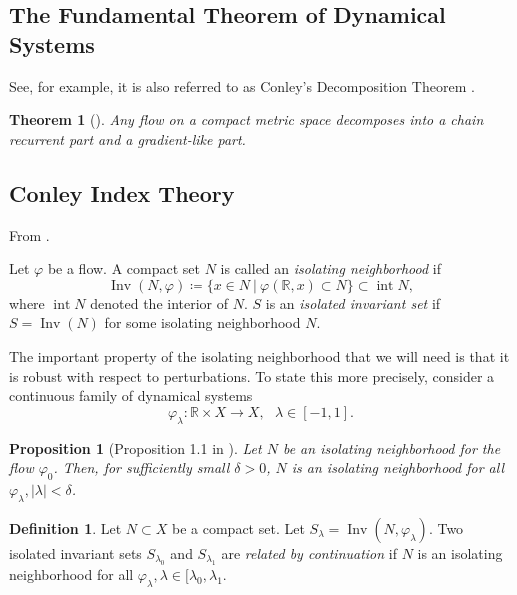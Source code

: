 \documentclass{article}
\newtheorem{theorem}{Theorem}
\newtheorem{proposition}{Proposition}
\theoremstyle{definition} \newtheorem{definition}{Definition}
\theoremstyle{remark} \newtheorem{remark}{Remark}
\newcommand{\reals}{\mathbb{R}}
\newcommand{\inv}{\operatorname{Inv}}
\newcounter{ct}
\begin{document}
\subsection{The Fundamental Theorem of Dynamical Systems}\label{sec:fundamental}
See, for example\citep{conley1978morse, norton1995fundamental}, it is also referred to as Conley's Decomposition Theorem \citep{mischaikow1999cit}.

\begin{theorem}[\citep{conley1978morse}]
 Any flow on a compact metric space decomposes into a chain recurrent part and a gradient-like part.
\end{theorem}



\subsection{Conley Index Theory}\label{sec:cit}
From \citet{mischaikow1999cit}.

Let $\varphi$ be a flow. A compact set $N$ is called an \emph{isolating neighborhood} if 
\[
\inv(N,\varphi) \coloneqq \{x\in N\ | \ \varphi(\reals,x)\subset N\} \subset \operatorname{int} N,
\]
where $ \operatorname{int} N$ denoted the interior of $N$. 
$S$ is an \emph{isolated invariant set} if $S=\inv(N)$ for some isolating neighborhood $N$.

The important property of the isolating neighborhood that we will need is that it is robust with respect to perturbations. To state this more precisely, consider a continuous family of dynamical systems
\begin{equation}
\varphi_\lambda\colon \reals\times X\rightarrow X, \ \ \ \lambda\in[-1,1].
\end{equation}

\begin{proposition}[Proposition 1.1 in \citep{mischaikow1999cit}]
Let $N$ be an isolating neighborhood for the flow $\varphi_0$. Then, for sufficiently small $\delta>0$, $N$ is an isolating neighborhood for all $\varphi_\lambda, |\lambda|<\delta$.
\end{proposition}

\begin{definition}
Let $N\subset X$ be a compact set. 
Let $S_\lambda = \inv(N,\varphi_\lambda).$
Two isolated invariant sets $S_{\lambda_0}$ and $S_{\lambda_1}$ are \emph{related by continuation} if $N$ is an isolating neighborhood for all $\varphi_\lambda, \lambda\in[\lambda_0,\lambda_1$.
\end{definition}
\end{document}
